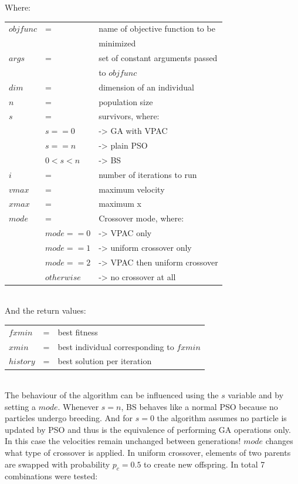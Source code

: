 \documentclass{acm_proc_article-sp}
\begin{document}
Where:\\
\begin{tabular}{lll}
$objfunc$   & = & name of objective function to be \\
           &   & minimized\\
$args$      & = & set of constant arguments passed \\
            & & to $objfunc$\\
$dim$       & = & dimension of an individual\\
$n$         & = & population size\\
$s$         & = & survivors, where:\\
          & $s == 0$ & -> GA with VPAC\\
          & $s == n$ & -> plain PSO\\
          & $0 < s < n$ & -> BS\\
$i$         & = & number of iterations to run\\
$vmax$      & = & maximum velocity\\
$xmax$      & = & maximum x\\
$mode$      & = & Crossover mode, where:\\
      & $mode == 0$ & -> VPAC only\\
      & $mode == 1$ & -> uniform crossover only\\
      & $mode == 2$ & -> VPAC then uniform crossover\\
      & $otherwise$ & -> no crossover at all\\
\end{tabular}\\
And the return values:\\
\begin{tabular}{lll}
$fxmin$ & = & best fitness \\
$xmin$ & = & best individual corresponding to $fxmin$\\
$history$ & = & best solution per iteration\\
\end{tabular}\\

The behaviour of the algorithm can be influenced using the $s$ variable and by setting a $mode$. Whenever $s = n$, BS behaves like a normal PSO because no particles undergo breeding. And for $s = 0$ the algorithm assumes no particle is updated by PSO and thus is the equivalence of performing GA operations only. In this case the velocities remain unchanged between generations!
$mode$ changes what type of crossover is applied. In uniform crossover, elements of two parents are swapped with probability $p_c = 0.5$ to create new offspring.
In total 7 combinations were tested:\\
\end{document}
